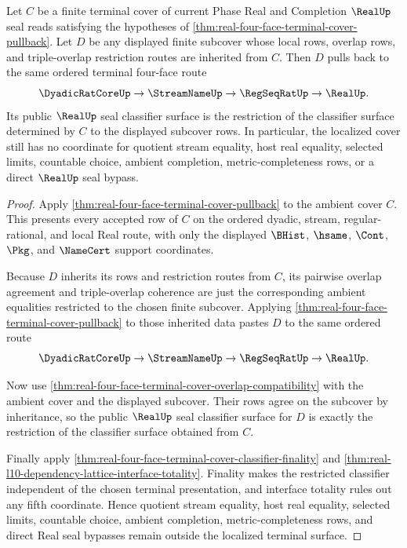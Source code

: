 \begin{theorem}
\label{thm:real-four-face-terminal-subcover-localization}
Let $C$ be a finite terminal cover of current Phase Real and Completion
$\RealUp$ seal reads satisfying the hypotheses of
\autoref{thm:real-four-face-terminal-cover-pullback}. Let $D$ be any displayed
finite subcover whose local rows, overlap rows, and triple-overlap restriction
routes are inherited from $C$. Then $D$ pulls back to the same ordered terminal
four-face route
$$
\DyadicRatCoreUp \to \StreamNameUp \to \RegSeqRatUp \to \RealUp.
$$
Its public $\RealUp$ seal classifier surface is the restriction of the
classifier surface determined by $C$ to the displayed subcover rows. In
particular, the localized cover still has no coordinate for quotient stream
equality, host real equality, selected limits, countable choice, ambient
completion, metric-completeness rows, or a direct $\RealUp$ seal bypass.
\end{theorem}
\begin{proof}
Apply \autoref{thm:real-four-face-terminal-cover-pullback} to the ambient
cover $C$. This presents every accepted row of $C$ on the ordered dyadic,
stream, regular-rational, and local Real route, with only the displayed
$\BHist$, $\hsame$, $\Cont$, $\Pkg$, and $\NameCert$ support coordinates.

Because $D$ inherits its rows and restriction routes from $C$, its pairwise
overlap agreement and triple-overlap coherence are just the corresponding
ambient equalities restricted to the chosen finite subcover. Applying
\autoref{thm:real-four-face-terminal-cover-pullback} to those inherited data
pastes $D$ to the same ordered route
$$
\DyadicRatCoreUp \to \StreamNameUp \to \RegSeqRatUp \to \RealUp.
$$

Now use
\autoref{thm:real-four-face-terminal-cover-overlap-compatibility} with the
ambient cover and the displayed subcover. Their rows agree on the subcover by
inheritance, so the public $\RealUp$ seal classifier surface for $D$ is exactly
the restriction of the classifier surface obtained from $C$.

Finally apply
\autoref{thm:real-four-face-terminal-cover-classifier-finality} and
\autoref{thm:real-l10-dependency-lattice-interface-totality}. Finality makes
the restricted classifier independent of the chosen terminal presentation, and
interface totality rules out any fifth coordinate. Hence quotient stream
equality, host real equality, selected limits, countable choice, ambient
completion, metric-completeness rows, and direct Real seal bypasses remain
outside the localized terminal surface.
\end{proof}
